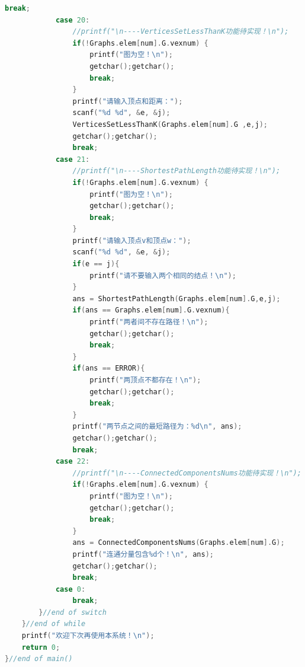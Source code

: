 \documentclass[supercite]{Experimental_Report}
\theoremstyle{definition}
\begin{document}
\begin{lstlisting}[language=c]
                break;
            case 20:
                //printf("\n----VerticesSetLessThanK功能待实现！\n");
                if(!Graphs.elem[num].G.vexnum) {
                    printf("图为空！\n");
                    getchar();getchar();
                    break;
                }
                printf("请输入顶点和距离："); 
                scanf("%d %d", &e, &j);
                VerticesSetLessThanK(Graphs.elem[num].G ,e,j);
                getchar();getchar();
                break;
            case 21:
                //printf("\n----ShortestPathLength功能待实现！\n");
                if(!Graphs.elem[num].G.vexnum) {
                    printf("图为空！\n");
                    getchar();getchar();
                    break;
                }
                printf("请输入顶点v和顶点w："); 
                scanf("%d %d", &e, &j);
                if(e == j){
                	printf("请不要输入两个相同的结点！\n"); 
				}
				ans = ShortestPathLength(Graphs.elem[num].G,e,j);
				if(ans == Graphs.elem[num].G.vexnum){
					printf("两者间不存在路径！\n");
                    getchar();getchar();
                    break;
				}
				if(ans == ERROR){
					printf("两顶点不都存在！\n");
                    getchar();getchar();
                    break;
				}
                printf("两节点之间的最短路径为：%d\n", ans);
                getchar();getchar();
                break;
            case 22:
                //printf("\n----ConnectedComponentsNums功能待实现！\n");
                if(!Graphs.elem[num].G.vexnum) {
                    printf("图为空！\n");
                    getchar();getchar();
                    break;
                }
                ans = ConnectedComponentsNums(Graphs.elem[num].G);
                printf("连通分量包含%d个！\n", ans);
                getchar();getchar();
                break;  
            case 0:
                break;
        }//end of switch
    }//end of while
    printf("欢迎下次再使用本系统！\n");
    return 0;
}//end of main()

\end{lstlisting}
\end{document}

